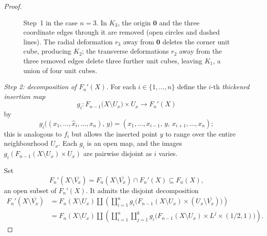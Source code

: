 \documentclass[10pt,a4paper]{amsart}
\newtheorem{scope}{Scope}
\begin{document}
\begin{proof}
\begin{figure}[ht]
\caption{Step~1 in the case \(n=3\). In \(K_3\), the origin
\(\mathbf0\) and the three coordinate edges through it are
removed (open circles and dashed lines). The radial deformation
\(r_3\) away from \(\mathbf0\) deletes the corner unit cube,
producing \(K_2\); the transverse deformations \(r_2\) away
from the three removed edges delete three further unit cubes,
leaving \(K_1\), a union of four unit cubes.}
\label{fig:K1-cube}
\end{figure}

\smallskip
\noindent\emph{Step 2: decomposition of \(F_n'(X)\).}
For each \(i\in\{1,\dots,n\}\) define the \(i\)-th
\emph{thickened insertion map}
\[
g_i\colon F_{n-1}\bigl(X\setminus U_x\bigr)
\times U_x \longrightarrow F_n'(X)
\]
by
\[
g_i\bigl((x_1,\dots,\hat{x}_i,\dots,x_n),\,y\bigr)
=
(x_1,\dots,x_{i-1},\,y,\,x_{i+1},\dots,x_n);
\]
this is analogous to \(f_i\) but allows the inserted point \(y\) to
range over the entire neighbourhood \(U_x\). Each \(g_i\) is an open
map, and the images \(g_i(F_{n-1}(X\setminus U_x)\times U_x)\) are
pairwise disjoint as \(i\) varies.

Set
\[
F_n'(X\setminus \overline{V_x})
=
F_n(X\setminus \overline{V_x})\cap F_n'(X)
\subseteq F_n(X),
\]
an open subset of \(F_n'(X)\). It admits the disjoint decomposition
\begin{align*}
F_n'(X\setminus \overline{V_x})
&=
F_n(X\setminus U_x)
\coprod
\left(\coprod_{i=1}^n g_i\bigl(F_{n-1}(X\setminus U_x)
\times (U_x\setminus \overline{V_x})\bigr)\right) \\
&=
F_n(X\setminus U_x)
\coprod
\left(\coprod_{i=1}^n\coprod_{j=1}^k
g_i\bigl(F_{n-1}(X\setminus U_x)\times L^j\times(1/2,1)\bigr)\right).
\end{align*}


\end{proof}
\end{document}
